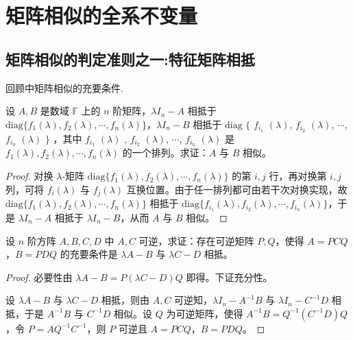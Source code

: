 \documentclass[../../main.tex]{subfiles}%
\begin{document}
\section{矩阵相似的全系不变量}

\subsection{矩阵相似的判定准则之一:特征矩阵相抵}

回顾中矩阵相似的充要条件.

\begin{proposition}\label{proposition:对角元素任意排列仍相似}
设 $A,B$ 是数域 $\mathbb{F}$ 上的 $n$ 阶矩阵，$\lambda I_n - A$ 相抵于 $\mathrm{diag}\{f_1(\lambda), f_2(\lambda), \cdots, f_n(\lambda)\}$，$\lambda I_n - B$ 相抵于 $\mathrm{diag}$ $\{ $ $f_{i_1}$ $(\lambda)$, $f_{i_2}$ $(\lambda)$, $\cdots$, $f_{i_n}$ $(\lambda)$ $\}$ ，其中 $f_{i_1}$ $(\lambda)$ , $f_{i_2}$ $(\lambda)$, $\cdots$, $f_{i_n}$ $(\lambda)$ 是 $f_1(\lambda), f_2(\lambda), \cdots, f_n(\lambda)$ 的一个排列。求证：$A$ 与 $B$ 相似。
\end{proposition}
\begin{proof}
对换 $\lambda$-矩阵 $\mathrm{diag}\{f_1(\lambda), f_2(\lambda), \cdots, f_n(\lambda)\}$ 的第 $i,j$ 行，再对换第 $i,j$ 列，可将 $f_i(\lambda)$ 与 $f_j(\lambda)$ 互换位置。由于任一排列都可由若干次对换实现，故 $\mathrm{diag}\{f_1(\lambda), f_2(\lambda), \cdots, f_n(\lambda)\}$ 相抵于 $\mathrm{diag}\{f_{i_1}(\lambda), f_{i_2}(\lambda), \cdots, f_{i_n}(\lambda)\}$，于是 $\lambda I_n - A$ 相抵于 $\lambda I_n - B$，从而 $A$ 与 $B$ 相似。
\end{proof}

\begin{example}
设 $n$ 阶方阵 $A,B,C,D$ 中 $A,C$ 可逆，求证：存在可逆矩阵 $P,Q$，使得 $A = PCQ$，$B = PDQ$ 的充要条件是 $\lambda A - B$ 与 $\lambda C - D$ 相抵。
\end{example}
\begin{proof}
必要性由 $\lambda A - B = P(\lambda C - D)Q$ 即得。下证充分性。

设 $\lambda A - B$ 与 $\lambda C - D$ 相抵，则由 $A,C$ 可逆知，$\lambda I_n - A^{-1}B$ 与 $\lambda I_n - C^{-1}D$ 相抵，于是 $A^{-1}B$ 与 $C^{-1}D$ 相似。设 $Q$ 为可逆矩阵，使得 $A^{-1}B = Q^{-1}(C^{-1}D)Q$，令 $P = AQ^{-1}C^{-1}$，则 $P$ 可逆且 $A = PCQ$，$B = PDQ$。
\end{proof}
\end{document}
